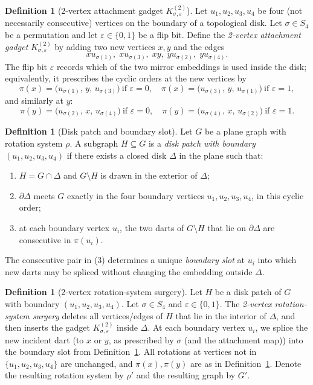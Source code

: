 \documentclass[12pt]{article}
\theoremstyle{definition}
\newtheorem{definition}[theorem]{Definition}
\newcommand{\RefinedCFourGadgetVertices}{2}
\begin{document}
\begin{definition}[\RefinedCFourGadgetVertices-vertex attachment gadget $K^{(2)}_{\sigma,\varepsilon}$]
\label{def:2v-gadget}
Let $u_1,u_2,u_3,u_4$ be four (not necessarily consecutive) vertices on the boundary of a topological disk.
Let $\sigma \in S_4$ be a permutation and let $\varepsilon\in\{0,1\}$ be a flip bit.
Define the \emph{\RefinedCFourGadgetVertices-vertex attachment gadget} $K^{(2)}_{\sigma,\varepsilon}$ by adding two new vertices $x,y$
and the edges
\[
xu_{\sigma(1)},\; xu_{\sigma(3)},\; xy,\; yu_{\sigma(2)},\; yu_{\sigma(4)}.
\]
The flip bit $\varepsilon$ records which of the two mirror embeddings is used inside the disk; equivalently,
it prescribes the cyclic orders at the new vertices by
\[
\pi(x) = \big(u_{\sigma(1)},\, y,\, u_{\sigma(3)}\big)\ \text{if }\varepsilon=0,\quad
\pi(x) = \big(u_{\sigma(3)},\, y,\, u_{\sigma(1)}\big)\ \text{if }\varepsilon=1,
\]
and similarly at $y$:
\[
\pi(y) = \big(u_{\sigma(2)},\, x,\, u_{\sigma(4)}\big)\ \text{if }\varepsilon=0,\quad
\pi(y) = \big(u_{\sigma(4)},\, x,\, u_{\sigma(2)}\big)\ \text{if }\varepsilon=1.
\]
\end{definition}

\begin{definition}[Disk patch and boundary slot]
\label{def:boundary-slot}
Let $G$ be a plane graph with rotation system $\rho$.
A subgraph $H\subseteq G$ is a \emph{disk patch with boundary} $(u_1,u_2,u_3,u_4)$ if there exists a closed disk
$\Delta$ in the plane such that:
\begin{enumerate}
  \item $H = G \cap \Delta$ and $G\setminus H$ is drawn in the exterior of $\Delta$;
  \item $\partial\Delta$ meets $G$ exactly in the four boundary vertices $u_1,u_2,u_3,u_4$, in this cyclic order;
  \item at each boundary vertex $u_i$, the two darts of $G\setminus H$ that lie on $\partial\Delta$ are consecutive in $\pi(u_i)$.
\end{enumerate}
The consecutive pair in (3) determines a unique \emph{boundary slot} at $u_i$ into which new darts may be
spliced without changing the embedding outside $\Delta$.
\end{definition}

\begin{definition}[\RefinedCFourGadgetVertices-vertex rotation-system surgery]
\label{def:2v-surgery}
Let $H$ be a disk patch of $G$ with boundary $(u_1,u_2,u_3,u_4)$.
Let $\sigma \in S_4$ and $\varepsilon\in\{0,1\}$.
The \emph{\RefinedCFourGadgetVertices-vertex rotation-system surgery} deletes all vertices/edges of $H$ that lie in the interior of $\Delta$,
and then inserts the gadget $K^{(2)}_{\sigma,\varepsilon}$ inside $\Delta$.
At each boundary vertex $u_i$, we splice the new incident dart (to $x$ or $y$, as prescribed by $\sigma$ (and the attachment map))
into the boundary slot from Definition~\ref{def:boundary-slot}.
All rotations at vertices not in $\{u_1,u_2,u_3,u_4\}$ are unchanged, and $\pi(x),\pi(y)$ are as in
Definition~\ref{def:2v-gadget}.
Denote the resulting rotation system by $\rho'$ and the resulting graph by $G'$.
\end{definition}
\end{document}
